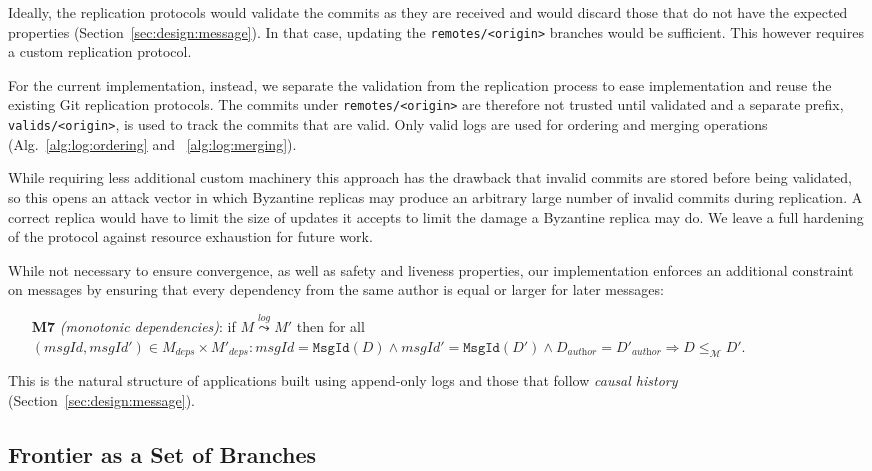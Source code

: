 \documentclass[9pt, oneside]{article}   	%
\newcommand{\logleadsto}{\overset{\textit{log}}\leadsto}
\begin{document}
Ideally, the replication protocols would validate the commits as they are received and would discard those that do not have the expected properties (Section~\ref{sec:design:message}). In that case, updating the \texttt{remotes/<origin>} branches would be sufficient. This however requires a custom replication protocol.

For the current implementation, instead, we separate the validation from the replication process to ease implementation and reuse the existing Git replication protocols. The commits under \texttt{remotes/<origin>} are therefore not trusted until validated and a separate prefix, \texttt{valids/<origin>}, is used to track the commits that are valid. Only valid logs are used for ordering and merging operations (Alg.~\ref{alg:log:ordering} and ~\ref{alg:log:merging}).

While requiring less additional custom machinery this approach has the drawback that invalid commits are stored before being validated, so this opens an attack vector in which Byzantine replicas may produce an arbitrary large number of invalid commits during replication. A correct replica would have to limit the size of updates it accepts to limit the damage a Byzantine replica may do. We leave a full hardening of the protocol against resource exhaustion for future work.

While not necessary to ensure convergence, as well as safety and liveness properties, our implementation enforces an additional constraint on messages by ensuring that every dependency from the same author is equal or larger for later messages:

\begin{tcolorbox}
\begin{enumerate}
	\item [\textbf{M7}] \textit{(monotonic dependencies)}: if $M \logleadsto M'$ then for all $(\textit{msgId}, \textit{msgId}') \in M_\textit{deps} \times M'_\textit{deps} : \textit{msgId} = \texttt{MsgId}(D) \wedge \textit{msgId}' = \texttt{MsgId}(D') \wedge D_\textit{author} = D'_\textit{author} \Rightarrow D \leq_\mathcal{M} D'$.
\end{enumerate}
\end{tcolorbox}

This is the natural structure of applications built using append-only logs and those that follow \textit{causal history} (Section~\ref{sec:design:message}).

\subsection{Frontier as a Set of Branches}
\end{document}
